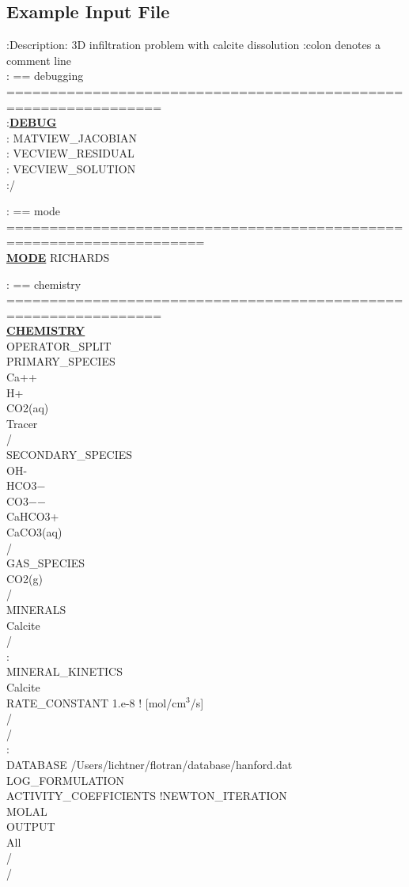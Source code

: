 \documentclass[12pt]{article}
\begin{document}
\clearpage

\subsection{Example Input File}

\hypertarget{target_input_file}{}

\footnotesize
:Description: 3D infiltration problem with calcite dissolution
:colon denotes a comment line\\

\noindent
: == debugging ================================================================\\
:\hyperlink{target_dbg}{\bf DEBUG}\\
:  MATVIEW\_JACOBIAN\\
:  VECVIEW\_RESIDUAL\\
:  VECVIEW\_SOLUTION\\
:/

\noindent
: == mode =====================================================================\\
\hyperlink{target_mode}{\bf MODE} RICHARDS

\noindent
: == chemistry ================================================================\\
\hyperlink{target_chem}{\bf CHEMISTRY}\\
OPERATOR\_SPLIT\\
PRIMARY\_SPECIES\\
  Ca++\\
  H+\\
  CO2(aq)\\
  Tracer\\
/\\
SECONDARY\_SPECIES\\
  OH-\\
  HCO3$-$\\
  CO3$-$$-$\\
  CaHCO3+\\
  CaCO3(aq)\\
/\\
GAS\_SPECIES\\
  CO2(g)\\
/\\
MINERALS\\
  Calcite\\
/\\
:\\
MINERAL\_KINETICS\\
Calcite\\
RATE\_CONSTANT 1.e-8 ! [mol/cm$^3$/s]\\
/\\
/\\
:\\
DATABASE /Users/lichtner/flotran/database/hanford.dat\\
LOG\_FORMULATION\\
ACTIVITY\_COEFFICIENTS !NEWTON\_ITERATION\\
MOLAL\\
OUTPUT\\
All\\
/\\
/
\end{document}
